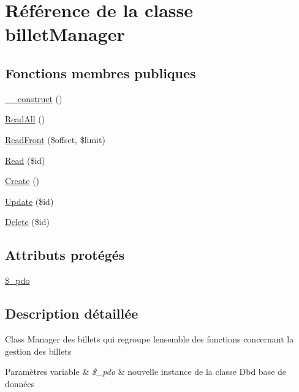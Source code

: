 \hypertarget{class_src_1_1_managers_1_1billet_manager}{}\section{Référence de la classe billet\+Manager}
\label{class_src_1_1_managers_1_1billet_manager}
\subsection*{Fonctions membres publiques}
\begin{DoxyCompactItemize}
\item 
\hyperlink{class_src_1_1_managers_1_1billet_manager_a095c5d389db211932136b53f25f39685}{\+\_\+\+\_\+construct} ()
\item 
\hyperlink{class_src_1_1_managers_1_1billet_manager_a24f9f6fa83eb8694eab0a87b2e6ad0b1}{Read\+All} ()
\item 
\hyperlink{class_src_1_1_managers_1_1billet_manager_af7e26a4a8ffd767a1265151f87860ddb}{Read\+Front} (\$offset, \$limit)
\item 
\hyperlink{class_src_1_1_managers_1_1billet_manager_ad2bbc9b3130abdfe3a9fc9e9fe36716f}{Read} (\$id)
\item 
\hyperlink{class_src_1_1_managers_1_1billet_manager_ad01f71fa0ecc039494e3c282864298c3}{Create} ()
\item 
\hyperlink{class_src_1_1_managers_1_1billet_manager_a82232b33fbfacdbdb8a8f49acaecf564}{Update} (\$id)
\item 
\hyperlink{class_src_1_1_managers_1_1billet_manager_a59113b5ecd1d155db6a4f30af34a1e80}{Delete} (\$id)
\end{DoxyCompactItemize}
\subsection*{Attributs protégés}
\begin{DoxyCompactItemize}
\item 
\hyperlink{class_src_1_1_managers_1_1billet_manager_a1e6d977917b70dce7e26cebad8438bf4}{\$\+\_\+pdo}
\end{DoxyCompactItemize}


\subsection{Description détaillée}
Class Manager des billets qui regroupe l\textquotesingle{}ensemble des fonctions concernant la gestion des billets 
\begin{DoxyParams}[1]{Paramètres}
variable & {\em \$\+\_\+pdo} & nouvelle instance de la classe Dbd base de données \\
\hline
\end{DoxyParams}


